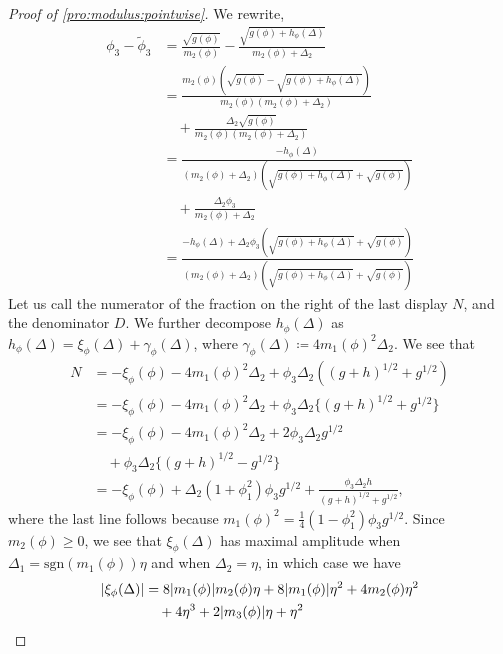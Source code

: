 \documentclass[journal]{IEEEtran}
\newcommand{\sgn}{\mathrm{sgn}}
\newcommand{\1}{\boldsymbol{1}}
\DeclarePairedDelimiter{\abs}{\lvert}{\rvert}
\begin{document}
\begin{proof}[Proof of \cref{pro:modulus:pointwise}]
	We rewrite,
	\begin{align*}
		\phi_3 - \tilde{\phi}_3%
		&= \frac{\sqrt{g(\phi)}}{m_2(\phi)} - \frac{\sqrt{g(\phi) + h_{\phi}(\Delta)}}{m_2(\phi) + \Delta_2}\\
		&= \frac{m_2(\phi)(\sqrt{g(\phi)} - \sqrt{g(\phi) + h_{\phi}(\Delta)}) }{m_2(\phi)(m_2(\phi) + \Delta_2)}\\%
          &\quad
		+ \frac{\Delta_2 \sqrt{g(\phi)}}{m_2(\phi)(m_2(\phi) + \Delta_2)}\\
		&=\frac{-h_{\phi}(\Delta)}{(m_2(\phi) + \Delta_2)( \sqrt{g(\phi) + h_{\phi}(\Delta)} + \sqrt{g(\phi)} )}\\%
          &\quad%
		+ \frac{\Delta_2 \phi_3 }{m_2(\phi) + \Delta_2}\\
		&= \frac{-h_{\phi}(\Delta) + \Delta_2\phi_3(\sqrt{g(\phi) + h_{\phi}(\Delta)} + \sqrt{g(\phi)}) }{(m_2(\phi) + \Delta_2)( \sqrt{g(\phi) + h_{\phi}(\Delta)} + \sqrt{g(\phi)} )}
	\end{align*}
	Let us call the numerator of the fraction on the right of the last display  $N$, and the denominator $D$. We further decompose $h_{\phi}(\Delta)$ as
	$h_{\phi}(\Delta) = \xi_{\phi}(\Delta) + \gamma_{\phi}(\Delta)$, where $\gamma_{\phi}(\Delta) \coloneqq 4m_1(\phi)^2\Delta_2$.
	We see that
	\begin{align*}
		N%
		&= - \xi_{\phi}(\phi) - 4m_1(\phi)^2\Delta_2%
		+ \phi_3\Delta_2( (g+h)^{1/2} + g^{1/2}  )\\
		&= - \xi_{\phi}(\phi) -4 m_1(\phi)^2\Delta_2 + \phi_3\Delta_2\{ (g+h)^{1/2} + g^{1/2}  \}\\
		&=- \xi_{\phi}(\phi) - 4m_1(\phi)^2\Delta_2 + 2\phi_3\Delta_2 g^{1/2}\\
          &\quad+ \phi_3\Delta_2\{ (g+h)^{1/2} - g^{1/2} \}\\
		&=- \xi_{\phi}(\phi) +  \Delta_2 (1+\phi_1^2)\phi_3g^{1/2} + \frac{\phi_3\Delta_2 h}{(g+h)^{1/2} + g^{1/2}},
	\end{align*}
	where the last line follows because
	$m_1(\phi)^2 = \frac{1}{4}(1-\phi_1^2)\phi_3 g^{1/2}$. Since
	$m_2(\phi) \geq 0$, we see that $\xi_{\phi}(\Delta)$ has maximal amplitude when
	$\Delta_1 = \sgn(m_1(\phi))\eta$ and when $\Delta_2 = \eta$, in which case we have
	\begin{align*}
		\abs{\xi_{\phi}(\Delta)}%
          &= 8\abs{m_1(\phi)}m_2(\phi)\eta + 8\abs{m_1(\phi)}\eta^2 + 4m_2(\phi)\eta^2\\
          &\quad+ 4\eta^3%
		+2 \abs{m_3(\phi)}\eta + \eta^2\\

\end{align*}
\end{proof}
\end{document}
